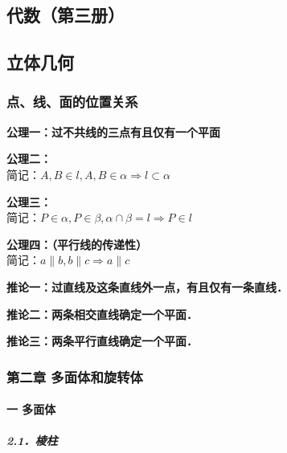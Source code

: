 \documentclass[
]{article}
\begin{document}
\hypertarget{ux4ee3ux6570ux7b2cux4e09ux518cuxff09}{%
\subsection{代数（第三册）}\label{ux4ee3ux6570ux7b2cux4e09ux518cuxff09}}

\hypertarget{ux7acbux4f53ux51e0ux4f55}{%
\subsection{立体几何}\label{ux7acbux4f53ux51e0ux4f55}}

\hypertarget{ux70b9ux7ebfux9762ux7684ux4f4dux7f6eux5173ux7cfb}{%
\subsubsection{点、线、面的位置关系}\label{ux70b9ux7ebfux9762ux7684ux4f4dux7f6eux5173ux7cfb}}

\textbf{公理一：过不共线的三点有且仅有一个平面}

\textbf{公理二：}\\
简记：\(A, B \in l, A, B \in \alpha \Rightarrow l \subset \alpha  \ \)

\textbf{公理三：}\\
简记：\(P \in \alpha, P \in \beta, \alpha \cap \beta = l \Rightarrow P \in l\)

\textbf{公理四：（平行线的传递性）}\\
简记：\(a \parallel b, b \parallel c \Rightarrow a \parallel c\)

\textbf{推论一：过直线及这条直线外一点，有且仅有一条直线．}

\textbf{推论二：两条相交直线确定一个平面．}

\textbf{推论三：两条平行直线确定一个平面．}

\hypertarget{ux7b2cux4e8cux7ae0--ux591aux9762ux4f53ux548cux65cbux8f6cux4f53}{%
\subsubsection{第二章
多面体和旋转体}\label{ux7b2cux4e8cux7ae0--ux591aux9762ux4f53ux548cux65cbux8f6cux4f53}}

\hypertarget{ux4e00--ux591aux9762ux4f53}{%
\paragraph{一 多面体}\label{ux4e00--ux591aux9762ux4f53}}

\hypertarget{21ux68f1ux67f1}{%
\subparagraph{2.1．棱柱}\label{21ux68f1ux67f1}}
\end{document}
